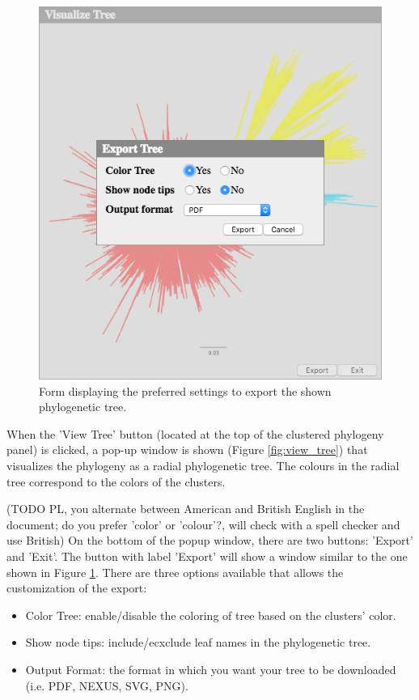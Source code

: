\documentclass[a4paper, 11pt]{article} %
\begin{document}
\begin{figure}[H]
\centering
\includegraphics[scale=0.50]{images/export_tree.PNG}
\vspace{-0.25cm}
\caption{Form displaying the preferred settings to export the shown phylogenetic tree.}
\label{fig:export_tree}
\end{figure}

When the 'View Tree' button (located at the top of the clustered phylogeny panel) is clicked, a pop-up window is shown (Figure \ref{fig:view_tree}) that visualizes the phylogeny as a radial phylogenetic tree. 
The colours in the radial tree correspond to the colors of the clusters.

(TODO PL, you alternate between American and British English in the document; do you prefer 'color' or 'colour'?, will check with a spell checker and use British)
\break
\break
On the bottom of the popup window, there are two buttons: 'Export' and 'Exit'.
The button with label 'Export' will show a window similar to the one shown in Figure \ref{fig:export_tree}. There are three options available that allows the customization of the export:
\begin{itemize}
\item Color Tree: enable/disable the coloring of tree based on the clusters' color.

\item Show node tips: include/ecxclude leaf names in the phylogenetic tree.
\item Output Format: the format in which you want your tree to be downloaded (i.e. PDF, NEXUS, SVG, PNG).
\end{itemize}
  
\end{document}
